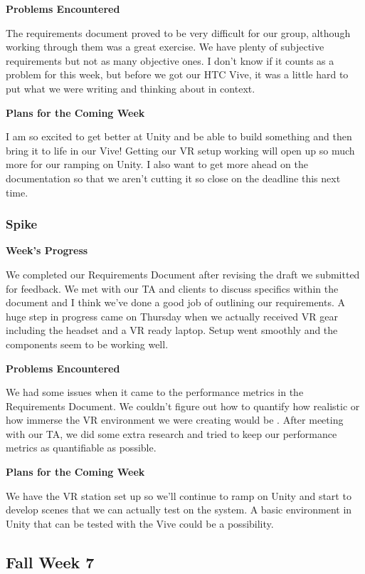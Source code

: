 \documentclass[10pt,journal,compsoc,onecolumn, draftclsnofoot]{IEEEtran}
\begin{document}
\noindent \textbf{Problems Encountered}

The requirements document proved to be very difficult for our group, although working through them was a great exercise. We have plenty of subjective requirements but not as many objective ones. I don't know if it counts as a problem for this week, but before we got our HTC Vive, it was a little hard to put what we were writing and thinking about in context.

\noindent \textbf{Plans for the Coming Week}

I am so excited to get better at Unity and be able to build something and then bring it to life in our Vive!  Getting our VR setup working will open up so much more for our ramping on Unity.  I also want to get more ahead on the documentation so that we aren't cutting it so close on the deadline this next time.

\subsubsection{Spike}
\noindent \textbf{Week's Progress}

We completed our Requirements Document after revising the draft we submitted for feedback. We met with our TA and clients to discuss specifics within the document and I think we've done a good job of outlining our requirements. A huge step in progress came on Thursday when we actually received VR gear including the headset and a VR ready laptop. Setup went smoothly and the components seem to be working well.

\noindent \textbf{Problems Encountered}

We had some issues when it came to the performance metrics in the Requirements Document. We couldn't figure out how to quantify how realistic or how immerse the VR environment we were creating would be . After meeting with our TA, we did some extra research and tried to keep our performance metrics as quantifiable as possible.

\noindent \textbf{Plans for the Coming Week}

We have the VR station set up so we'll continue to ramp on Unity and start to develop scenes that we can actually test on the system. A basic environment in Unity that can be tested with the Vive could be a possibility.

\subsection{Fall Week 7}
\end{document}

